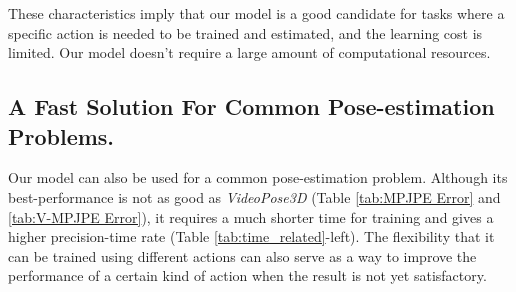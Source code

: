 \documentclass[10pt,twocolumn,letterpaper]{article}
\begin{document}
These characteristics imply that our model is a good candidate for tasks where a specific action is needed to be trained and estimated, and the learning cost is limited.
Our model doesn't require a large amount of computational resources.

\subsection{A Fast Solution For Common Pose-estimation Problems.}

Our model can also be used for a common pose-estimation problem. Although its best-performance is not as good as \textit{VideoPose3D} (Table \ref{tab:MPJPE Error} 
and \ref{tab:V-MPJPE Error}), it requires a much shorter time for training and gives a higher precision-time rate (Table \ref{tab:time_related}-left). The flexibility
that it can be trained using different actions can also serve as a way to improve the performance of a certain kind of action when the result is not yet satisfactory.
\end{document}
